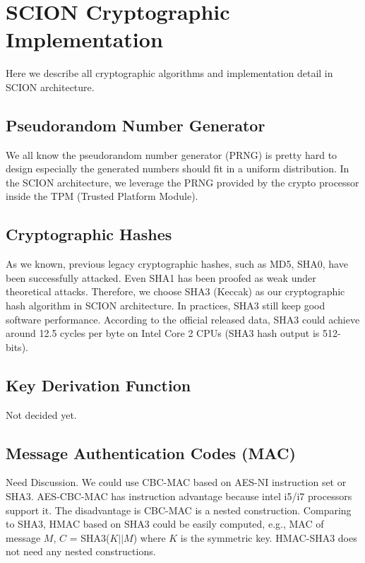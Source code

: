 
\section{SCION Cryptographic Implementation}


Here we describe all cryptographic algorithms and implementation detail in SCION architecture. 

\subsection{Pseudorandom Number Generator}
We all know the pseudorandom number generator (PRNG) is pretty hard to design especially
the generated numbers should fit in a uniform distribution.
In the SCION architecture, we leverage the PRNG provided by the crypto processor inside
the TPM (Trusted Platform Module).

\subsection{Cryptographic Hashes}
As we known, previous legacy cryptographic hashes, such as MD5, SHA0, have been successfully attacked. %
Even SHA1 has been proofed as weak under theoretical attacks. %
Therefore, we choose SHA3 (Keccak) as our cryptographic hash algorithm in SCION architecture.
In practices, SHA3 still keep good software performance. According to the official released data, 
SHA3 could achieve around 12.5 cycles per byte on Intel Core 2 CPUs (SHA3 hash output is 512-bits). 

\subsection{Key Derivation Function}
Not decided yet.

\subsection{Message Authentication Codes (MAC)}
Need Discussion. We could use CBC-MAC based on AES-NI instruction set or SHA3.
AES-CBC-MAC has instruction advantage because intel i5/i7 processors support it.
The disadvantage is CBC-MAC is a nested construction.
Comparing to SHA3, HMAC based on SHA3 could be easily computed,
e.g., MAC of message $M$, $C$ = SHA3($K||M$) where $K$ is the symmetric key.
HMAC-SHA3 does not need any nested constructions.

